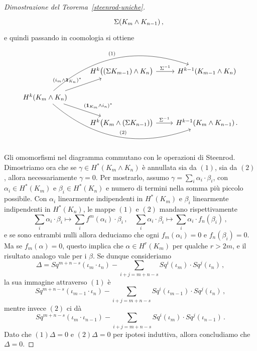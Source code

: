 \begin{proof}[Dimostrazione del Teorema~\ref{steenrod-uniche}]
\begin{equation*}
\begin{tikzcd}
			& \Sigma (K_{m} \wedge K_{n-1})\,,
		\end{tikzcd}
	\end{equation*}
	e quindi passando in coomologia si ottiene
	\begin{equation*}
		\begin{tikzcd}
			& H^{k}\big((\Sigma K_{m-1}) \wedge K_{n}\big)  \ar[r, "\Sigma^{-1}"]
			& H^{k-1}(K_{m-1} \wedge K_{n}) \\
			H^{k}(K_{m} \wedge K_{n}) \ar[ur, "(i_{m} \wedge \cat{1}_{K_{n}})^{*}"]
			\ar[dr, "(\cat{1}_{K_{m}} \wedge i_{n})^{*}"] 
			\ar[urr, bend left, "(1)"] \ar[drr, bend right, "(2)"] & & \\
			& H^{k}\big( K_{m} \wedge (\Sigma K_{n-1}) \big)  \ar[r, "\Sigma^{-1}"]
			& H^{k-1}(K_{m} \wedge K_{n-1})\,.
		\end{tikzcd}
	\end{equation*}
	Gli omomorfismi nel diagramma commutano con le operazioni di Steenrod.
	Dimostriamo ora che se $\gamma \in H^{*}(K_{m} \wedge K_{n})$ è annullata
	sia da $(1)$, sia da $(2)$, allora necessariamente $\gamma=0$.
	Per mostrarlo, assumo $\gamma = \sum_{i} \alpha_{i} \cdot \beta_{i}$,
	con $\alpha_{i} \in H^{*}(K_{m})$ e $\beta_{i} \in H^{*}(K_{n})$
	e numero di termini nella somma più piccolo possibile.
	Con $\alpha_{i}$ linearmente indipendenti in $H^{*}(K_{m})$
	e $\beta_{i}$ linearmente indipendenti in $H^{*}(K_{n})$,
	le mappe $(1)$ e $(2)$ mandano rispettivamente
	\begin{equation*}
		\sum_{i} \alpha_{i} \cdot \beta_{i} \mapsto \sum_{i} f^{m}(\alpha_{i}) \cdot \beta_{i}\,,
		\quad \sum_{i} \alpha_{i} \cdot \beta_{i} \mapsto \sum_{i} \alpha_{i} \cdot f_{n}(\beta_{i})\,,
	\end{equation*}
	e se sono entrambi nulli allora deduciamo che ogni $f_{m}(\alpha_{i})=0$ 
	e $f_{n}(\beta_{i})=0$. Ma se $f_{m}(\alpha) = 0$, 
	questo implica che $\alpha \in H^{r}(K_{m})$ per qualche $r > 2m$, e il risultato analogo vale per i $\beta$. Se dunque consideriamo
	\begin{equation*}
		\Delta = Sq^{m+n-s}(\iota_{m} \cdot \iota_{n}) 
		- \sum_{i+j=m+n-s} Sq^{i}(\iota_{m}) \cdot Sq^{j}(\iota_{n})\,,
	\end{equation*}
	la sua immagine attraverso $(1)$ è 
	\begin{equation*}
		Sq^{m+n-s}(\iota_{m-1} \cdot \iota_{n}) 
		- \sum_{i+j=m+n-s} Sq^{i}(\iota_{m-1}) \cdot Sq^{j}(\iota_{n}) \,,
	\end{equation*}
	mentre invece $(2)$ ci dà
	\begin{equation*}
		Sq^{m+n-s}(\iota_{m} \cdot \iota_{n-1}) 
		- \sum_{i+j=m+n-s} Sq^{i}(\iota_{m}) \cdot Sq^{j}(\iota_{n-1})\,.
	\end{equation*}
	Dato che $(1) \Delta = 0$ e $(2) \Delta = 0$ per ipotesi induttiva,
	allora concludiamo che $\Delta = 0$.
\end{proof}

